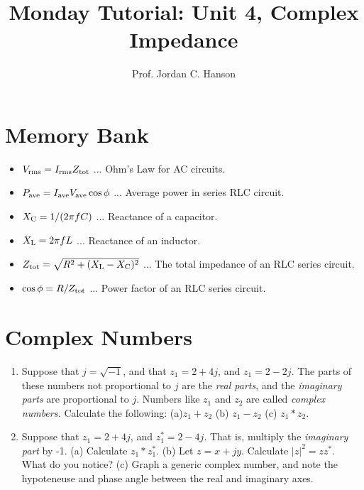 \documentclass{article}
\begin{document}
\twocolumn

\title{Monday Tutorial: Unit 4, Complex Impedance}
\author{Prof. Jordan C. Hanson}

\maketitle

\section{Memory Bank}

\begin{itemize}
\item $V_{\rm rms} = I_{\rm rms} Z_{\rm tot}$ ... Ohm's Law for AC circuits.
\item $P_{\rm ave} = I_{\rm ave} V_{\rm ave}\cos\phi$ ... Average power in series RLC circuit.
\item $X_{\rm C} = 1/(2\pi f C)$ ... Reactance of a capacitor.
\item $X_{\rm L} = 2\pi f L$ ... Reactance of an inductor.
\item $Z_{\rm tot} = \sqrt{R^2 + (X_{\rm L} - X_{\rm C})^2}$ ... The total impedance of an RLC series circuit.
\item $\cos\phi = R/Z_{\rm tot}$ ... Power factor of an RLC series circuit.
\end{itemize}

\section{Complex Numbers}

\begin{enumerate}
\item Suppose that $j = \sqrt{-1}$, and that $z_1 = 2 + 4j$, and $z_1 = 2 - 2j$.  The parts of these numbers not proportional to $j$ are the \textit{real parts}, and the \textit{imaginary parts} are proportional to $j$.  Numbers like $z_1$ and $z_2$ are called \textit{complex numbers.}  Calculate the following: (a)$z_1+z_2$ (b) $z_1-z_2$ (c) $z_1 * z_2$. \\ \vspace{1.5cm}
\item Suppose that $z_1 = 2 + 4j$, and $z_1^{*} = 2 - 4j$.  That is, multiply the \textit{imaginary part} by -1.  (a) Calculate $z_1 * z_1^{*}$. (b) Let $z = x+jy$.  Calculate $|z|^2 = zz^{*}$.  What do you notice? (c) Graph a generic complex number, and note the hypoteneuse and phase angle between the real and imaginary axes. \\ \vspace{1.5cm}
\end{enumerate}
\end{document}
